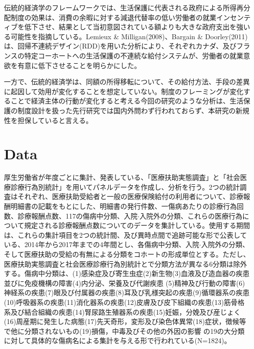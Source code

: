 \documentclass{jsarticle}
\begin{document}
伝統的経済学のフレームワークでは、生活保護に代表される政府による所得再分配制度の効果は、消費の余暇に対する減退代替率の低い労働者の就業インセンティブを低下させ、結果として当初意図されている額よりも大きな政府支出を強いる可能性を指摘している。Lemieux \& Milligan(2008)、Bargain \& Doorley(2011)は、回帰不連続デザイン(RDD)を用いた分析により、それぞれカナダ、及びフランスの特定コーホートへの生活保護の不連続な給付システムが、労働者の就業意欲を有意に低下させることを明らかにした。

一方で、伝統的経済学は、同額の所得移転について、その給付方法、手段の差異に起因して効用が変化することを想定していない。制度のフレーミングが変化することで経済主体の行動が変化すると考える今回の研究のような分析は、生活保護の制度設計を扱った先行研究では国内外問わず行われておらず、本研究の新規性を担保していると言える。

\section{Data}

厚生労働省が年度ごとに集計、発表している、「医療扶助実態調査」と「社会医療診療行為別統計」を用いてパネルデータを作成し、分析を行う。2つの統計調査はそれぞれ、医療扶助受給者と一般の医療保険給付の利用者について、診療報酬明細書の記載をもとにした、明細書の発行件数、一傷病あたりの診療行為回数、診療報酬点数、117の傷病中分類、入院$\cdot$入院外の分類、これらの医療行為について規定される診療報酬点数についてのデータを集計している。使用する期間は、これらの集計項目を2つの統計間、及び異時点間で追跡可能な形で公表している、2014年から2017年までの4年間とし、各傷病中分類、入院$\cdot$入院外の分類、そして医療扶助の受給の有無による分類をコホートの形成単位とする。ただし、医療扶助実態調査と社会医療診療行為別統計とで分類方法が異なる6分類は除外する。傷病中分類は、(1)感染症及び寄生虫症(2)新生物(3)血液及び造血器の疾患並びに免疫機構の障害(4)内分泌、栄養及び代謝疾患 (5)精神及び行動の障害(6)神経系の疾患(7)眼及び付属器の疾患(8)耳及び乳様突起の疾患(9)循環器系の疾患(10)呼吸器系の疾患(11)消化器系の疾患(12)皮膚及び皮下組織の疾患(13)筋骨格系及び結合組織の疾患(14)腎尿路生殖器系の疾患(15)妊娠，分娩及び産じょく(16)周産期に発生した病態(17)先天奇形，変形及び染色体異常(18)症状，徴候等で他に分類されないもの(19)損傷，中毒及びその他の外因の影響 の19の大分類に対して具体的な傷病名による集計を与える形で行われている(N=1824)。
\end{document}
